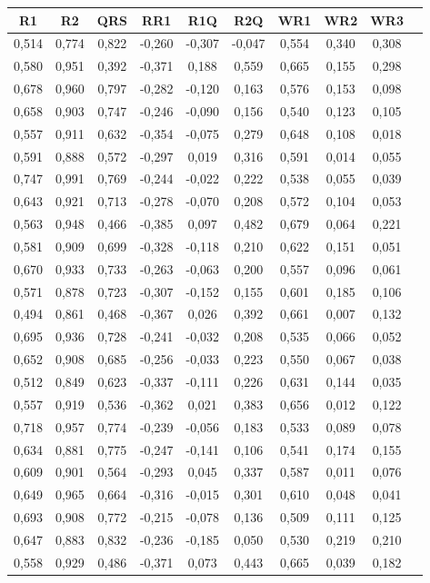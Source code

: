 \begin{table}[ht]
\centering
\begin{tabular}{|c|c|c|c|c|c|c|c|c|c|}
\hline 
    R1 & R2 & QRS & RR1 & R1Q & R2Q & WR1 & WR2 & WR3\\
\hline
	0,514&0,774&0,822&-0,260&-0,307&-0,047&0,554&0,340&0,308\\
	0,580&0,951&0,392&-0,371&0,188&0,559&0,665&0,155&0,298\\
	0,678&0,960&0,797&-0,282&-0,120&0,163&0,576&0,153&0,098\\
	0,658&0,903&0,747&-0,246&-0,090&0,156&0,540&0,123&0,105\\
	0,557&0,911&0,632&-0,354&-0,075&0,279&0,648&0,108&0,018\\
	0,591&0,888&0,572&-0,297&0,019&0,316&0,591&0,014&0,055\\
	0,747&0,991&0,769&-0,244&-0,022&0,222&0,538&0,055&0,039\\
	0,643&0,921&0,713&-0,278&-0,070&0,208&0,572&0,104&0,053\\
	0,563&0,948&0,466&-0,385&0,097&0,482&0,679&0,064&0,221\\
	0,581&0,909&0,699&-0,328&-0,118&0,210&0,622&0,151&0,051\\
	0,670&0,933&0,733&-0,263&-0,063&0,200&0,557&0,096&0,061\\
	0,571&0,878&0,723&-0,307&-0,152&0,155&0,601&0,185&0,106\\
	0,494&0,861&0,468&-0,367&0,026&0,392&0,661&0,007&0,132\\
	0,695&0,936&0,728&-0,241&-0,032&0,208&0,535&0,066&0,052\\
	0,652&0,908&0,685&-0,256&-0,033&0,223&0,550&0,067&0,038\\
	0,512&0,849&0,623&-0,337&-0,111&0,226&0,631&0,144&0,035\\
	0,557&0,919&0,536&-0,362&0,021&0,383&0,656&0,012&0,122\\
	0,718&0,957&0,774&-0,239&-0,056&0,183&0,533&0,089&0,078\\
	0,634&0,881&0,775&-0,247&-0,141&0,106&0,541&0,174&0,155\\
	0,609&0,901&0,564&-0,293&0,045&0,337&0,587&0,011&0,076\\
	0,649&0,965&0,664&-0,316&-0,015&0,301&0,610&0,048&0,041\\
	0,693&0,908&0,772&-0,215&-0,078&0,136&0,509&0,111&0,125\\
	0,647&0,883&0,832&-0,236&-0,185&0,050&0,530&0,219&0,210\\
	0,558&0,929&0,486&-0,371&0,073&0,443&0,665&0,039&0,182\\

\end{tabular}
\end{table}
